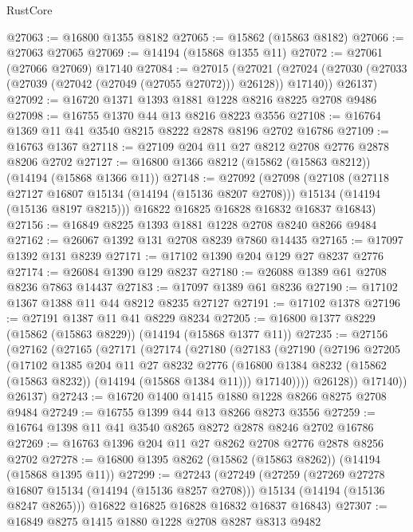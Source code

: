 \begin{lexlean}{RustCore}
\begin{coremodule}
@27063 := @16800 @1355 @8182
@27065 := @15862 (@15863 @8182)
@27066 := @27063 @27065
@27069 := @14194 (@15868 @1355 @11)
@27072 := @27061 (@27066 @27069) @17140
@27084 := @27015
    (@27021
      (@27024 (@27030 (@27033 (@27039 (@27042 (@27049 (@27055 @27072))) @26128)) @17140))
      @26137)
@27092 := @16720 @1371 @1393 @1881 @1228 @8216 @8225 @2708 @9486
@27098 := @16755 @1370 @44 @13 @8216 @8223 @3556
@27108 := @16764 @1369 @11 @41 @3540 @8215 @8222 @2878 @8196 @2702 @16786
@27109 := @16763 @1367
@27118 := @27109 @204 @11 @27 @8212 @2708 @2776 @2878 @8206 @2702
@27127 := @16800 @1366 @8212 (@15862 (@15863 @8212)) (@14194 (@15868 @1366 @11))
@27148 := @27092
    (@27098
      (@27108
        (@27118 @27127 @16807 @15134 (@14194 (@15136 @8207 @2708)))
        @15134
        (@14194 (@15136 @8197 @8215)))
      @16822
      @16825
      @16828
      @16832
      @16837
      @16843)
@27156 := @16849 @8225 @1393 @1881 @1228 @2708 @8240 @8266 @9484
@27162 := @26067 @1392 @131 @2708 @8239 @7860 @14435
@27165 := @17097 @1392 @131 @8239
@27171 := @17102 @1390 @204 @129 @27 @8237 @2776
@27174 := @26084 @1390 @129 @8237
@27180 := @26088 @1389 @61 @2708 @8236 @7863 @14437
@27183 := @17097 @1389 @61 @8236
@27190 := @17102 @1367 @1388 @11 @44 @8212 @8235 @27127
@27191 := @17102 @1378
@27196 := @27191 @1387 @11 @41 @8229 @8234
@27205 := @16800 @1377 @8229 (@15862 (@15863 @8229)) (@14194 (@15868 @1377 @11))
@27235 := @27156
    (@27162
      (@27165
        (@27171
          (@27174
            (@27180
              (@27183
                (@27190
                  (@27196
                    @27205
                    (@17102
                      @1385
                      @204
                      @11
                      @27
                      @8232
                      @2776
                      (@16800 @1384 @8232 (@15862 (@15863 @8232)) (@14194 (@15868 @1384 @11)))
                      @17140))))
              @26128))
          @17140))
      @26137)
@27243 := @16720 @1400 @1415 @1880 @1228 @8266 @8275 @2708 @9484
@27249 := @16755 @1399 @44 @13 @8266 @8273 @3556
@27259 := @16764 @1398 @11 @41 @3540 @8265 @8272 @2878 @8246 @2702 @16786
@27269 := @16763 @1396 @204 @11 @27 @8262 @2708 @2776 @2878 @8256 @2702
@27278 := @16800 @1395 @8262 (@15862 (@15863 @8262)) (@14194 (@15868 @1395 @11))
@27299 := @27243
    (@27249
      (@27259
        (@27269 @27278 @16807 @15134 (@14194 (@15136 @8257 @2708)))
        @15134
        (@14194 (@15136 @8247 @8265)))
      @16822
      @16825
      @16828
      @16832
      @16837
      @16843)
@27307 := @16849 @8275 @1415 @1880 @1228 @2708 @8287 @8313 @9482

\end{coremodule}
\end{lexlean}
